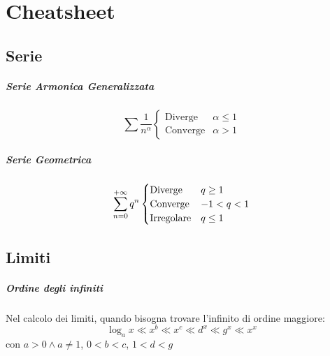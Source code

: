 \documentclass[12pt, a4paper, openany]{book}
\begin{document}
\chapter{Cheatsheet}
\section*{Serie}
\paragraph*{Serie Armonica Generalizzata}
\begin{equation*}
	\sum \frac{1}{n^\alpha} \begin{cases}
		\text{Diverge}  & \alpha\leq 1 \\
		\text{Converge} & \alpha> 1
	\end{cases}
\end{equation*}
\paragraph*{Serie Geometrica}
\begin{equation*}
	\sum_{n=0}^{+\infty} q^n \begin{cases}
		\text{Diverge}    & q\geq 1 \\
		\text{Converge}   & -1<q<1  \\
		\text{Irregolare} & q\leq 1
	\end{cases}
\end{equation*}
\section*{Limiti}
\paragraph*{Ordine degli infiniti}
Nel calcolo dei limiti, quando bisogna trovare l'infinito di ordine maggiore:
$$ \log_ax\ll x^b\ll x^c\ll d^x\ll g^x\ll x^x $$
con $a>0 \wedge a\neq 1$, $0<b<c$, $1<d<g$
\end{document}
